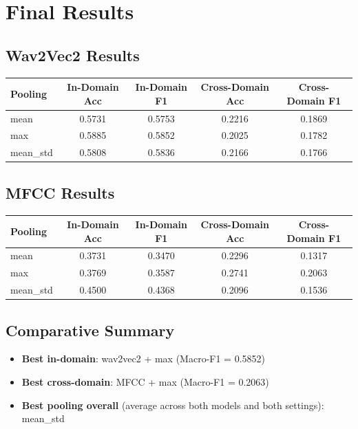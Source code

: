 \documentclass[11pt,a4paper]{article}
\begin{document}
\section{Final Results}
\subsection{Wav2Vec2 Results}
\begin{center}
\begin{tabular}{lcccc}
\toprule
Pooling & In-Domain Acc & In-Domain F1 & Cross-Domain Acc & Cross-Domain F1 \\
\midrule
mean     & 0.5731 & 0.5753 & 0.2216 & 0.1869 \\
max      & 0.5885 & 0.5852 & 0.2025 & 0.1782 \\
mean\_std & 0.5808 & 0.5836 & 0.2166 & 0.1766 \\
\bottomrule
\end{tabular}
\end{center}

\subsection{MFCC Results}
\begin{center}
\begin{tabular}{lcccc}
\toprule
Pooling & In-Domain Acc & In-Domain F1 & Cross-Domain Acc & Cross-Domain F1 \\
\midrule
mean     & 0.3731 & 0.3470 & 0.2296 & 0.1317 \\
max      & 0.3769 & 0.3587 & 0.2741 & 0.2063 \\
mean\_std & 0.4500 & 0.4368 & 0.2096 & 0.1536 \\
\bottomrule
\end{tabular}
\end{center}

\subsection{Comparative Summary}
\begin{itemize}
    \item \textbf{Best in-domain}: wav2vec2 + max (Macro-F1 = 0.5852)
    \item \textbf{Best cross-domain}: MFCC + max (Macro-F1 = 0.2063)
    \item \textbf{Best pooling overall} (average across both models and both settings): mean\_std
\end{itemize}
\end{document}
